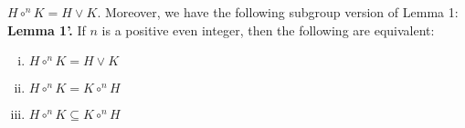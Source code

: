 \documentclass[11pt,reqno]{amsart}
\theoremstyle{plain}
\theoremstyle{definition}
\newtheorem{lemma}{Lemma}
\theoremstyle{remark}
\newcommand{\<}{\ensuremath{\langle}}
\renewcommand{\>}{\ensuremath{\rangle}}
\newcommand{\join}{\ensuremath{\vee}}
\newcommand{\circn}{\ensuremath{\circ^{n}}}
\begin{document}
$H\circn K = H \join K$.
\vskip2mm
\noindent
Moreover, we have the following subgroup version of Lemma 1:
\vskip2mm
\noindent
{\bf Lemma 1'.} If $n$ is a positive even integer, then the following are equivalent:
 \begin{enumerate}[(i)]
 \item $H \circn K = H \join K$
 \item $H \circn K = K \circn H$
 \item $H \circn K \subseteq K \circn H$
 \end{enumerate}


% 


\end{document}
